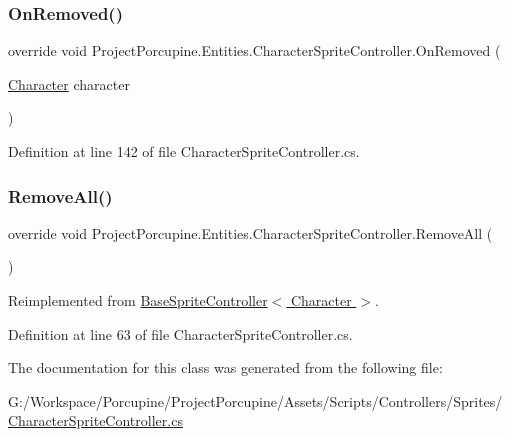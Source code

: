 \subsubsection{\texorpdfstring{On\+Removed()}{OnRemoved()}}
{\footnotesize\ttfamily override void Project\+Porcupine.\+Entities.\+Character\+Sprite\+Controller.\+On\+Removed (\begin{DoxyParamCaption}\item[{\hyperlink{class_project_porcupine_1_1_entities_1_1_character}{Character}}]{character }\end{DoxyParamCaption})\hspace{0.3cm}{\ttfamily [protected]}}



Definition at line 142 of file Character\+Sprite\+Controller.\+cs.

\mbox{\label{class_project_porcupine_1_1_entities_1_1_character_sprite_controller_acb355f0f1482b7ad05ab8cfe69b92974}} 
\subsubsection{\texorpdfstring{Remove\+All()}{RemoveAll()}}
{\footnotesize\ttfamily override void Project\+Porcupine.\+Entities.\+Character\+Sprite\+Controller.\+Remove\+All (\begin{DoxyParamCaption}{ }\end{DoxyParamCaption})\hspace{0.3cm}{\ttfamily [virtual]}}



Reimplemented from \hyperlink{class_base_sprite_controller_ae1fdf8c0abb1e362257540f2de80d6dc}{Base\+Sprite\+Controller$<$ Character $>$}.



Definition at line 63 of file Character\+Sprite\+Controller.\+cs.



The documentation for this class was generated from the following file\+:\begin{DoxyCompactItemize}
\item 
G\+:/\+Workspace/\+Porcupine/\+Project\+Porcupine/\+Assets/\+Scripts/\+Controllers/\+Sprites/\hyperlink{_character_sprite_controller_8cs}{Character\+Sprite\+Controller.\+cs}\end{DoxyCompactItemize}
